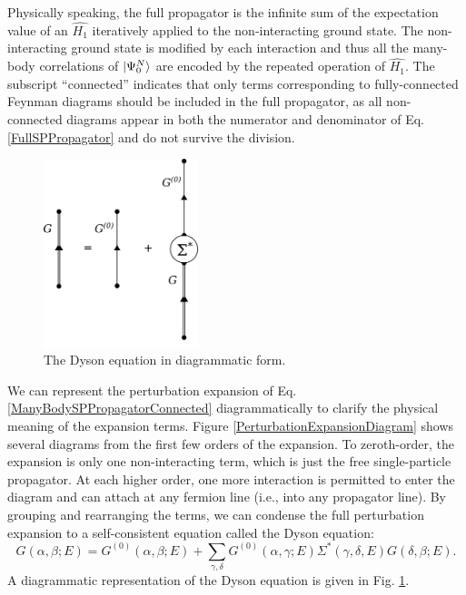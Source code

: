 Physically speaking, the full propagator is the infinite sum of the expectation value of 
an $\hat{H_{1}}$ iteratively applied to the non-interacting ground state. The
non-interacting ground state is modified by each interaction and thus all the many-body correlations
of $\ket{\Psi^{N}_{0}}$ are encoded by the repeated operation of $\hat{H_{1}}$. The subscript
``connected'' indicates that only terms corresponding to fully-connected Feynman 
diagrams should be included in the full propagator, as all non-connected diagrams appear in both 
the numerator and denominator of Eq. \ref{FullSPPropagator} and do not survive
the division.
\begin{figure}[tb]
    \centering
    \includegraphics[width=0.4\textwidth]{figures/DysonEquation.png}
    \caption{The Dyson equation in diagrammatic form.}
    \label{DysonEquationDiagram}
\end{figure}
We can represent the perturbation expansion of Eq. \ref{ManyBodySPPropagatorConnected}
diagrammatically to clarify the physical meaning of the expansion terms. Figure
\ref{PerturbationExpansionDiagram} shows several diagrams from the first few orders of the
expansion. To zeroth-order, 
the expansion is only one non-interacting term, which is just the free single-particle 
propagator. At each higher order, one more interaction is permitted to enter the
diagram and can attach at any fermion line (i.e., into any propagator line). By grouping and rearranging the terms, we can 
condense the full perturbation expansion to a
self-consistent equation called the \gls{Dyson equation}:
\begin{equation} \label{DysonEquation}
    G(\alpha,\beta;E) = G^{(0)}(\alpha,\beta;E) +
    \sum_{\gamma,\delta}G^{(0)}(\alpha,\gamma;E)\Sigma^{*}(\gamma,\delta,E)G(\delta,
    \beta; E).
\end{equation}
A diagrammatic representation of the Dyson equation is given in Fig. \ref{DysonEquationDiagram}.

